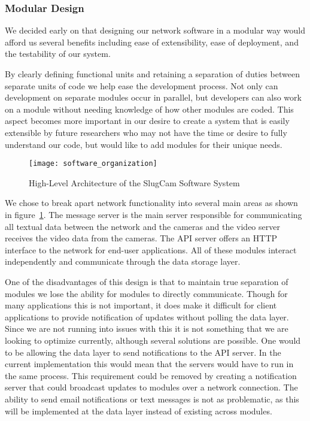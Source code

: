 \subsubsection{Modular Design}

We decided early on that designing our network software in a modular way would
afford us several benefits including ease of extensibility, ease of deployment,
and the testability of our system.

By clearly defining functional units and retaining a separation of duties
between separate units of code we help ease the development process. Not only
can development on separate modules occur in parallel, but developers can also
work on a module without needing knowledge of how other modules are coded. This
aspect becomes more important in our desire to create a system that is easily
extensible by future researchers who may not have the time or desire to fully
understand our code, but would like to add modules for their unique needs.

\begin{figure}[!t]
\centering
\texttt{[image: software\_organization]}
\caption{High-Level Architecture of the SlugCam Software System}
\label{fig_netoverview}
\end{figure}

We chose to break apart network functionality into several main areas as shown
in figure~\ref{fig_netoverview}. The message server is the main server
responsible for communicating all textual data between the network and the
cameras and the video server receives the video data from the cameras. The API
server offers an HTTP interface to the network for end-user applications. All of
these modules interact independently and communicate through the data storage
layer. 

One of the disadvantages of this design is that to maintain true separation of
modules we lose the ability for modules to directly communicate.  Though for
many applications this is not important, it does make it difficult for client
applications to provide notification of updates without polling the data layer.
Since we are not running into issues with this it is not something that we are
looking to optimize currently, although several solutions are possible. One
would to be allowing the data layer to send notifications to the API server.  In
the current implementation this would mean that the servers would have to run in
the same process. This requirement could be removed by creating a notification
server that could broadcast updates to modules over a network connection. The
ability to send email notifications or text messages is not as problematic, as
this will be implemented at the data layer instead of existing across modules.

